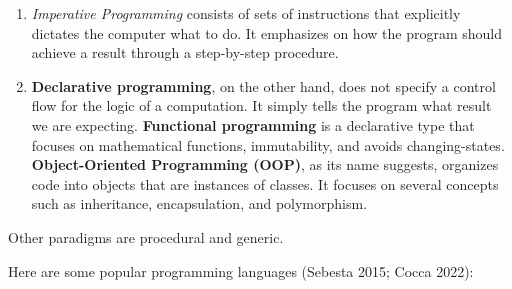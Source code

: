 \documentclass[
  letterpaper,
  DIV=11,
  numbers=noendperiod]{scrreprt}
\providecommand{\tightlist}{%
  \setlength{\itemsep}{0pt}\setlength{\parskip}{0pt}}\usepackage{longtable,booktabs,array}
\begin{document}
\begin{enumerate}
\def\labelenumi{\arabic{enumi}.}
\tightlist
\item
  \emph{Imperative Programming} consists of sets of instructions that
  explicitly dictates the computer what to do. It emphasizes on how the
  program should achieve a result through a step-by-step procedure.
\item
  \textbf{Declarative programming}, on the other hand, does not specify
  a control flow for the logic of a computation. It simply tells the
  program what result we are expecting. \textbf{Functional programming}
  is a declarative type that focuses on mathematical functions,
  immutability, and avoids changing-states. \textbf{Object-Oriented
  Programming (OOP)}, as its name suggests, organizes code into objects
  that are instances of classes. It focuses on several concepts such as
  inheritance, encapsulation, and polymorphism.
\end{enumerate}

Other paradigms are procedural and generic.

Here are some popular programming languages (Sebesta 2015; Cocca 2022):
\end{document}
